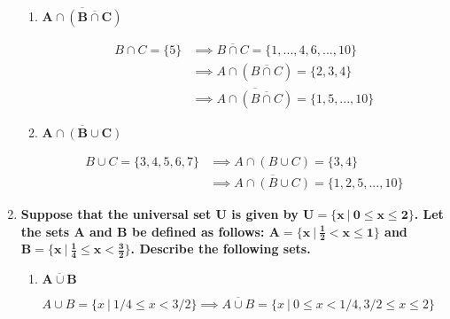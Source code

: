\documentclass[10pt, oneside]{article}   	%
\theoremstyle{definition}
\begin{document}
\begin{enumerate}[label=1.\arabic*]
\begin{enumerate}
	\item  \begin{tcolorbox}[
	  colback=Cerulean!5!white,
	  colframe=Cerulean!75!black]
	\textbf{$\bm{\overline{A \cap (\overline{B \cap C})}}$}
	\end{tcolorbox}
	
	\begin{align*}
	B \cap C = \{ 5 \} &\implies \overline{B \cap C} = \{ 1, ..., 4, 6, ..., 10 \} \\
	&\implies A \cap (\overline{B \cap C}) = \{ 2, 3, 4 \} \\
	&\implies \boxed{ \overline{A \cap (\overline{B \cap C})} = \{ 1, 5, ..., 10 \} }
	\end{align*}
	
	\item  \begin{tcolorbox}[
	  colback=Cerulean!5!white,
	  colframe=Cerulean!75!black]
	\textbf{$\bm{\overline{A \cap (B \cup C)}}$}
	\end{tcolorbox}
	
	\begin{align*}
	B \cup C = \{ 3, 4, 5, 6, 7 \} &\implies A \cap (B \cup C) = \{ 3, 4 \} \\
	&\implies \boxed{ \overline{A \cap (B \cup C)} = \{ 1, 2, 5, ..., 10 \} }
	\end{align*}
	
	\end{enumerate}

\item  \begin{tcolorbox}[
  colback=Cerulean!5!white,
  colframe=Cerulean!75!black]
\textbf{Suppose that the universal set $\bm{U}$ is given by $\bm{U = \{ x \ | \ 0 \leq x \leq 2 \}}$. Let the sets $\bm{A}$ and $\bm{B}$ be defined as follows: $\bm{A = \{ x \ | \ \frac{1}{2} < x \leq 1 \}}$ and $\bm{B = \{ x \ | \ \frac{1}{4} \leq x < \frac{3}{2} \}}$. Describe the following sets.}
\end{tcolorbox}

	\begin{enumerate}
	\item  \begin{tcolorbox}[
	  colback=Cerulean!5!white,
	  colframe=Cerulean!75!black]
	\textbf{$\bm{\overline{A \cup B}}$}
	\end{tcolorbox}
	
	$A \cup B = \{ x \ | \ 1/4 \leq x < 3/2 \} \implies \boxed{\overline{A \cup B} = \{ x \ | \ 0 \leq x < 1/4, 3/2 \leq x \leq 2 \} }$
	

\end{enumerate}
\end{enumerate}
\end{document}
